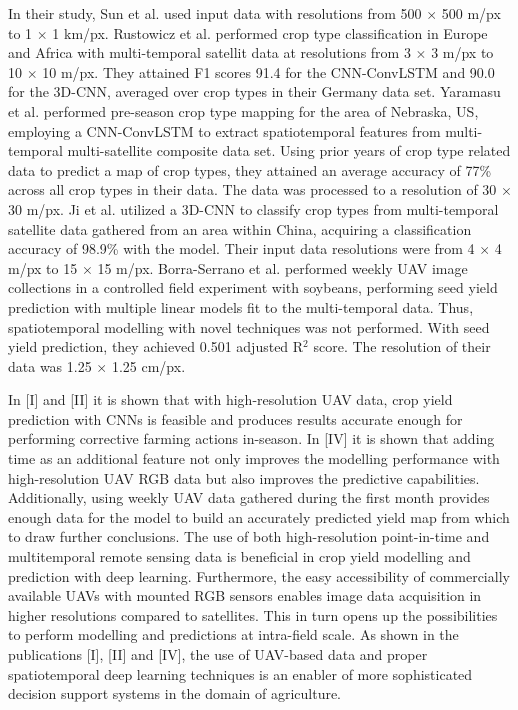 In their study, Sun et al. \cite{Sun2020} used input data with resolutions from 500 $\times$ 500 m/px to 1 $\times$ 1 km/px. Rustowicz et al. \cite{Rustowicz2019} performed crop type classification in Europe and Africa with multi-temporal satellit data at resolutions from 3 $\times$ 3 m/px to 10 $\times$ 10 m/px. They attained F1 scores 91.4 for the CNN-ConvLSTM and 90.0 for the 3D-CNN, averaged over crop types in their Germany data set. Yaramasu et al. \cite{Yaramasu2020} performed pre-season crop type mapping for the area of Nebraska, US, employing a CNN-ConvLSTM to extract spatiotemporal features from multi-temporal multi-satellite composite data set. Using prior years of crop type related data to predict a map of crop types, they attained an average accuracy of 77\% across all crop types in their data. The data was processed to a resolution of 30 $\times$ 30 m/px. Ji et al. \cite{Ji2018} utilized a 3D-CNN to classify crop types from multi-temporal satellite data gathered from an area within China, acquiring a classification accuracy of 98.9\% with the model. Their input data resolutions were from 4 $\times$ 4 m/px to 15 $\times$ 15 m/px. Borra-Serrano et al. \cite{Borra-Serrano2020} performed weekly UAV image collections in a controlled field experiment with soybeans, performing seed yield prediction with multiple linear models fit to the multi-temporal data. Thus, spatiotemporal modelling with novel techniques was not performed. With seed yield prediction, they achieved 0.501 adjusted R$^2$ score. The resolution of their data was 1.25 $\times$ 1.25 cm/px.

In [I] and [II] it is shown that with high-resolution UAV data, crop yield prediction with CNNs is feasible and produces results accurate enough for performing corrective farming actions in-season. In [IV] it is shown that adding time as an additional feature not only improves the modelling performance with high-resolution UAV RGB data but also improves the predictive capabilities. Additionally, using weekly UAV data gathered during the first month provides enough data for the model to build an accurately predicted yield map from which to draw further conclusions. The use of both high-resolution point-in-time and multitemporal remote sensing data is beneficial in crop yield modelling and prediction with deep learning. Furthermore, the easy accessibility of commercially available UAVs with mounted RGB sensors enables image data acquisition in higher resolutions compared to satellites. This in turn opens up the possibilities to perform modelling and predictions at intra-field scale. As shown in the publications [I], [II] and [IV], the use of UAV-based data and proper spatiotemporal deep learning techniques is an enabler of more sophisticated decision support systems in the domain of agriculture. 


